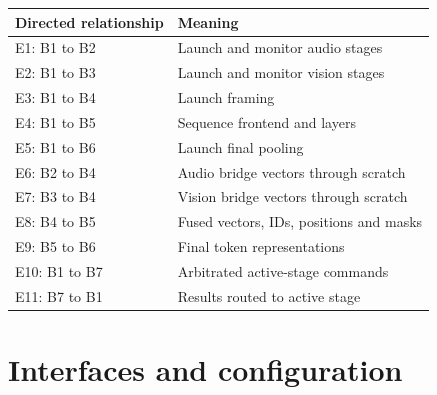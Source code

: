 \documentclass[11pt,a4paper]{article}
\begin{document}
{\small\renewcommand{\arraystretch}{1.18}\begin{longtable}{@{}L{0.24\textwidth}|L{0.7\textwidth}@{}}\toprule

\textbf{Directed relationship} & \textbf{Meaning}\\\midrule\endhead

E1: B1 to B2 & Launch and monitor audio stages\\[2pt]\hline

E2: B1 to B3 & Launch and monitor vision stages\\[2pt]\hline

E3: B1 to B4 & Launch framing\\[2pt]\hline

E4: B1 to B5 & Sequence frontend and layers\\[2pt]\hline

E5: B1 to B6 & Launch final pooling\\[2pt]\hline

E6: B2 to B4 & Audio bridge vectors through scratch\\[2pt]\hline

E7: B3 to B4 & Vision bridge vectors through scratch\\[2pt]\hline

E8: B4 to B5 & Fused vectors,\allowbreak{} IDs,\allowbreak{} positions and masks\\[2pt]\hline

E9: B5 to B6 & Final token representations\\[2pt]\hline

E10: B1 to B7 & Arbitrated active-stage commands\\[2pt]\hline

E11: B7 to B1 & Results routed to active stage\\[2pt]\hline

\bottomrule\end{longtable}}

\section{Interfaces and configuration}
\end{document}
